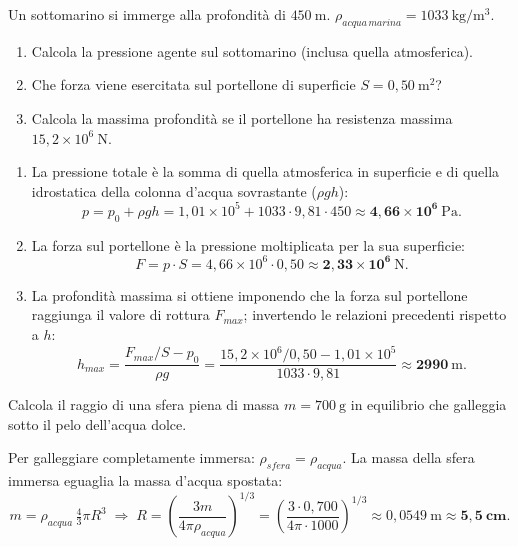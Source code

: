 \begin{question}[ID=5.1, subtitle={Sottomarino a 450 m di profondità}, tags={fluidi, pressione idrostatica}, difficulty=media]
Un sottomarino si immerge alla profondità di $450\ \mathrm{m}$. $\rho_{acqua\,marina} = 1033\ \mathrm{kg/m^3}$.
\begin{enumerate}
    \item Calcola la pressione agente sul sottomarino (inclusa quella atmosferica).
    \item Che forza viene esercitata sul portellone di superficie $S = 0{,}50\ \mathrm{m^2}$?
    \item Calcola la massima profondità se il portellone ha resistenza massima $15{,}2\times10^6\ \mathrm{N}$.
\end{enumerate}
\begin{solution}
\begin{enumerate}
    \item La pressione totale è la somma di quella atmosferica in superficie e di quella idrostatica della colonna d'acqua sovrastante ($\rho g h$):
    \[
    p = p_0 + \rho g h = 1{,}01\times10^5 + 1033\cdot 9{,}81\cdot 450 \approx \mathbf{4{,}66\times10^6\ \mathrm{Pa}}.
    \]
    \item La forza sul portellone è la pressione moltiplicata per la sua superficie:
    \[
    F = p\cdot S = 4{,}66\times10^6\cdot 0{,}50 \approx \mathbf{2{,}33\times10^6\ \mathrm{N}}.
    \]
    \item La profondità massima si ottiene imponendo che la forza sul portellone raggiunga il valore di rottura $F_{max}$; invertendo le relazioni precedenti rispetto a $h$:
    \[
    h_{max} = \frac{F_{max}/S - p_0}{\rho g} = \frac{15{,}2\times10^6/0{,}50 - 1{,}01\times10^5}{1033\cdot 9{,}81} \approx \mathbf{2990\ \mathrm{m}}.
    \]
\end{enumerate}
\end{solution}
\end{question}


\begin{question}[ID=6.1, subtitle={Raggio di una sfera in equilibrio sotto il pelo dell'acqua}, tags={fluidi, Archimede, galleggiamento}, difficulty=media]
Calcola il raggio di una sfera piena di massa $m = 700\ \mathrm{g}$ in equilibrio che galleggia sotto il pelo dell'acqua dolce.
\begin{solution}
Per galleggiare completamente immersa: $\rho_{sfera} = \rho_{acqua}$. La massa della sfera immersa eguaglia la massa d'acqua spostata:
\[
m = \rho_{acqua}\,\tfrac{4}{3}\pi R^3
\;\Rightarrow\;
R = \left(\frac{3m}{4\pi\rho_{acqua}}\right)^{1/3} = \left(\frac{3\cdot0{,}700}{4\pi\cdot1000}\right)^{1/3} \approx 0{,}0549\ \mathrm{m} \approx \mathbf{5{,}5\ cm}.
\]
\end{solution}
\end{question}

